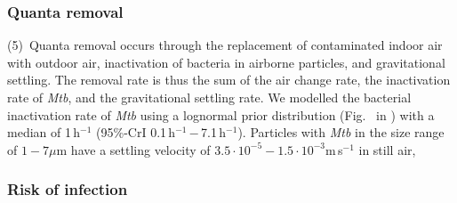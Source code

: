 \documentclass[fleqn,11pt]{wlscirep}
\begin{document}
\subsubsection*{Quanta removal}

(5)~Quanta removal occurs through the replacement of contaminated indoor air with outdoor air, inactivation of bacteria in airborne particles, and gravitational settling. The removal rate is thus the sum of the air change rate, the inactivation rate of \emph{Mtb}, and the gravitational settling rate. We modelled the bacterial inactivation rate of \emph{Mtb} using a lognormal prior distribution (Fig.~ in \supp) with a median of 1\,h$^{-1}$ (95\%-CrI 0.1\,h$^{-1}$\,$-$\,7.1\,h$^{-1}$)\cite{Loudon1969AMRRD,Lever2000LettersAppliedMicrobio,Gannon2007ResVetSci,Klein2014IJMyco}.  Particles with \emph{Mtb} in the size range of $1-7\mu$m\cite{Fennelly2020Lancet} have a settling velocity of  $3.5\cdot 10^{-5}-1.5\cdot 10^{-3}$m\,s$^{-1}$ in still air\cite{Vuorinen2020SafSci}, 

\subsubsection*{Risk of infection}
\end{document}
